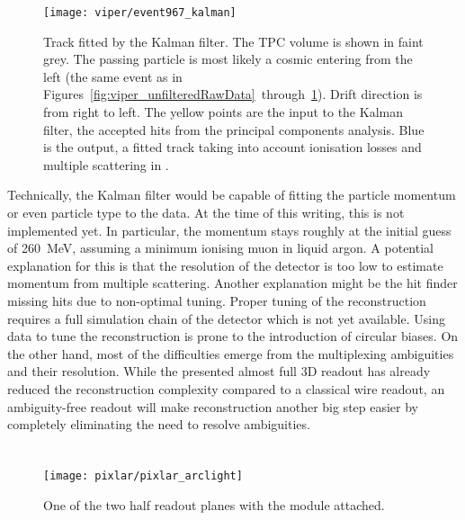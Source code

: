 \begin{figure}[htb]
	\centering
	\texttt{[image: viper/event967\_kalman]}
	\caption{Track fitted by the Kalman filter.
	The TPC volume is shown in faint grey.
	The passing particle is most likely a cosmic \Pgm entering from the left (the same event as in Figures~\ref{fig:viper_unfilteredRawData}~through~\ref{fig:viper_kalman}).
	Drift direction is from right to left.
	The yellow points are the input to the Kalman filter, the accepted hits from the principal components analysis.
	Blue is the output, a fitted track taking into account ionisation losses and multiple scattering in \lar{}.}
	\label{fig:viper_kalman}
\end{figure}

Technically, the Kalman filter would be capable of fitting the particle momentum or even particle type to the data.
At the time of this writing, this is not implemented yet.
In particular, the momentum stays roughly at the initial guess of \SI{260}{\mega\electronvolt}, assuming a minimum ionising muon in liquid argon.
A potential explanation for this is that the resolution of the detector is too low to estimate momentum from multiple scattering.
Another explanation might be the hit finder missing hits due to non-optimal tuning.
Proper tuning of the reconstruction requires a full simulation chain of the detector which is not yet available.
Using data to tune the reconstruction is prone to the introduction of circular biases.
On the other hand, most of the difficulties emerge from the multiplexing ambiguities and their resolution.
While the presented almost full 3D readout has already reduced the reconstruction complexity compared to a classical wire readout, an ambiguity-free readout will make reconstruction another big step easier by completely eliminating the need to resolve ambiguities.


\section{\pixlar{}}
\label{sec:viper_pixlar}

\begin{figure}[htb]
	\centering
	\texttt{[image: pixlar/pixlar\_arclight]}
	\caption{One of the two \pixlar{} half readout planes with the \AL{} module attached.}
	\label{fig:pixlar_arclight}
\end{figure}


